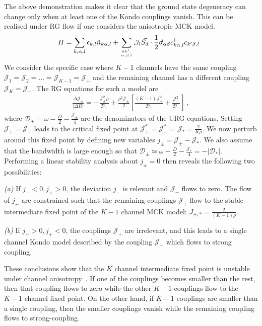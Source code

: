 \documentclass[reprint,prb,superscriptaddress]{revtex4-2}
\begin{document}
The above demonstration makes it clear that the ground state degeneracy can change only when at least one of the Kondo couplings vanish. This can be realised under RG flow if one considers the anisotropic MCK model.
\begin{align}
	H = \sum_{k,\alpha,l}\epsilon_{k,l} \hat n_{k\alpha,l} + \sum_{kk^\prime,\atop{\alpha,\beta,l}}{\mathcal{J}}_l \vec{S_d}\cdot\frac{1}{2}\vec{\sigma}_{\alpha\beta}c_{k\alpha,l}^\dagger c_{k^\prime\beta, l}~.
\end{align}
We consider the specific case where \(K-1\) channels have the same coupling \({\mathcal{J}}_1 = {\mathcal{J}}_2 = ... = {\mathcal{J}}_{K-1} = {\mathcal{J}}_+\) and the remaining channel has a different coupling \({\mathcal{J}}_K = {\mathcal{J}}_-\). The RG equations for such a model are
\begin{align}
	\frac{\Delta {\mathcal{J}}_\pm}{|\Delta D|} = -\frac{{\mathcal{J}}_\pm^2 \rho}{\mathcal{D}_\pm} + \frac{\rho^2 {\mathcal{J}}_\pm}{2}\left[\frac{(K-1){\mathcal{J}}_+^2}{\mathcal{D}_+} + \frac{{\mathcal{J}}_-^2}{\mathcal{D}_-}\right]~,
\end{align}
where \(\mathcal{D}_\pm = \omega - \frac{D}{2} - \frac{{\mathcal{J}}_\pm}{4}\) are the denominators of the URG equations.
Setting \({\mathcal{J}}_+ = {\mathcal{J}}_-\) leads to the critical fixed point at \({\mathcal{J}}_+^* = {\mathcal{J}}_-^* = {\mathcal{J}}_* = \frac{2}{K \rho}\). We now perturb around this fixed point by defining new variables \(j_\pm = {\mathcal{J}}_\pm - {\mathcal{J}}_*\). We also assume that the bandwidth is large enough so that \(\mathcal{D}_\pm \simeq \omega - \frac{D}{2} - \frac{{\mathcal{J}}_*}{4} = -|\mathcal{D}_*|\). Performing a linear stability analysis about \(j_\pm=0\) then reveals the following two possibilities:

\par\textit{(a)} If \(j_-<0,j_+>0\), the deviation \(j_-\) is relevant and \(\mathcal{J}_-\) flows to zero. The flow of \(j_+\) are constrained such that the remaining couplings \(\mathcal{J}_+\) flow to the stable intermediate fixed point of the \(K-1\) channel MCK model: \(J_{+,*} = \frac{2}{(K-1)\rho}\).
\par\textit{(b)} If \(j_- > 0, j_+<0\), the couplings \(\mathcal{J}_+\) are irrelevant, and this leads to a single channel Kondo model described by the coupling \(\mathcal{J}_-\) which flows to strong coupling.

These conclusions show that the \(K\) channel intermediate fixed point is unstable under channel anisotropy~\cite{Noz_blandin_1980,andrei_jerez_1995,affleck_pang_cox_1992,zarand_2000}. If one of the couplings becomes smaller than the rest, then that coupling flows to zero while the other \(K-1\) couplings flow to the \(K-1\) channel fixed point. On the other hand, if \(K-1\) couplings are smaller than a single coupling, then the smaller couplings vanish while the remaining coupling flows to strong-coupling.
\end{document}
